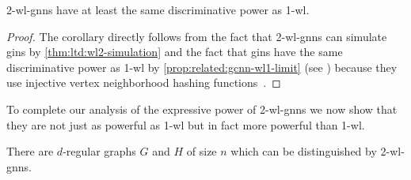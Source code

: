 \begin{cor}\label{cor:ltd:wl2-gnn-wl1-power}
	2-\acs{wl}-\acsp{gnn} have at least the same discriminative power as 1-\acs{wl}.
\end{cor}
\begin{proof}
	The corollary directly follows from the fact that 2-\acs{wl}-\acsp{gnn} can simulate \acp{gin} by \cref{thm:ltd:wl2-simulation} and the fact that \acp{gin} have the same discriminative power as 1-\acs{wl} by \cref{prop:related:gcnn-wl1-limit} (see ) because they use injective vertex neighborhood hashing functions~\cite{Xu2018}.
\end{proof}

To complete our analysis of the expressive power of 2-\acs{wl}-\acsp{gnn} we now show that they are not just as powerful as 1-\acs{wl} but in fact more powerful than 1-\acs{wl}.
\begin{prop}\label{cor:ltd:wl2-gnn-regular}
	There are $d$-regular graphs $G$ and $H$ of size $n$ which can be distinguished by 2-\acs{wl}-\acsp{gnn}.
\end{prop}
